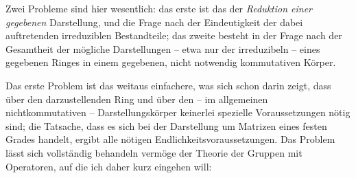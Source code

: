 Zwei Probleme sind hier wesentlich: das erste ist das der \emph{Reduktion einer gegebenen} Darstellung, und die Frage nach der Eindeutigkeit der dabei auftretenden irreduziblen Bestandteile; das zweite besteht in der Frage nach der Gesamtheit der mögliche Darstellungen -- etwa nur der irreduzibeln -- eines gegebenen Ringes in einem gegebenen, nicht notwendig kommutativen Körper.

Das erste Problem ist das weitaus einfachere, was sich schon darin zeigt, dass über den darzustellenden Ring und über den -- im allgemeinen nichtkommutativen -- Darstellungskörper keinerlei spezielle Voraussetzungen nötig sind; die Tatsache, dass es sich bei der Darstellung um Matrizen eines festen Grades handelt, ergibt alle nötigen Endlichkeitsvoraussetzungen. Das Problem lässt sich vollständig behandeln vermöge der Theorie der Gruppen mit Operatoren, auf die ich daher kurz eingehen will:
